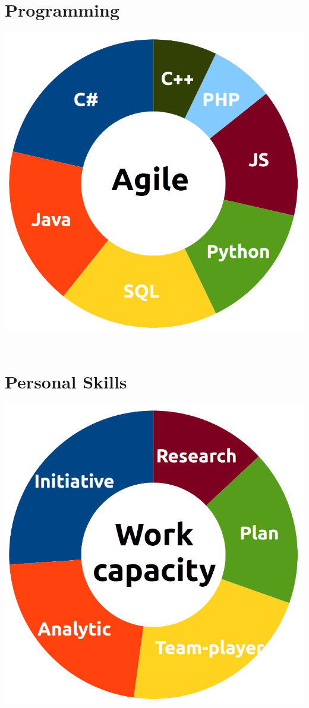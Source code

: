 \documentclass[]{cv-class}
\begin{document}
\begin{aside}
  \section{Programming}
    \includegraphics[scale=0.22]{img/programming2.png}
    ~

  \section{Personal Skills}
    \includegraphics[scale=0.22]{img/personal2.png}
    ~

\end{aside}
\end{document}
